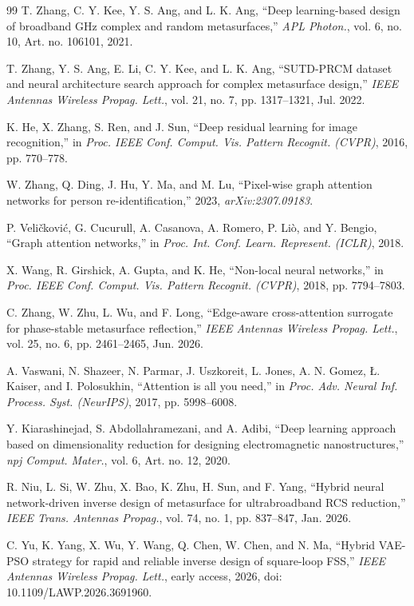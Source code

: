 \documentclass[journal]{IEEEtran}
\begin{document}
\begin{thebibliography}{99}
 T. Zhang, C. Y. Kee, Y. S. Ang, and L. K. Ang, ``Deep learning-based design of broadband GHz complex and random metasurfaces,'' \textit{APL Photon.}, vol. 6, no. 10, Art. no. 106101, 2021.

 T. Zhang, Y. S. Ang, E. Li, C. Y. Kee, and L. K. Ang, ``SUTD-PRCM dataset and neural architecture search approach for complex metasurface design,'' \textit{IEEE Antennas Wireless Propag. Lett.}, vol. 21, no. 7, pp. 1317--1321, Jul. 2022.

 K. He, X. Zhang, S. Ren, and J. Sun, ``Deep residual learning for image recognition,'' in \textit{Proc. IEEE Conf. Comput. Vis. Pattern Recognit. (CVPR)}, 2016, pp. 770--778.

 W. Zhang, Q. Ding, J. Hu, Y. Ma, and M. Lu, ``Pixel-wise graph attention networks for person re-identification,'' 2023, \textit{arXiv:2307.09183}.

 P. Veli\v{c}kovi\'{c}, G. Cucurull, A. Casanova, A. Romero, P. Li\`{o}, and Y. Bengio, ``Graph attention networks,'' in \textit{Proc. Int. Conf. Learn. Represent. (ICLR)}, 2018.

 X. Wang, R. Girshick, A. Gupta, and K. He, ``Non-local neural networks,'' in \textit{Proc. IEEE Conf. Comput. Vis. Pattern Recognit. (CVPR)}, 2018, pp. 7794--7803.

 C. Zhang, W. Zhu, L. Wu, and F. Long, ``Edge-aware cross-attention surrogate for phase-stable metasurface reflection,'' \textit{IEEE Antennas Wireless Propag. Lett.}, vol. 25, no. 6, pp. 2461--2465, Jun. 2026.

 A. Vaswani, N. Shazeer, N. Parmar, J. Uszkoreit, L. Jones, A. N. Gomez, {\L}. Kaiser, and I. Polosukhin, ``Attention is all you need,'' in \textit{Proc. Adv. Neural Inf. Process. Syst. (NeurIPS)}, 2017, pp. 5998--6008.

 Y. Kiarashinejad, S. Abdollahramezani, and A. Adibi, ``Deep learning approach based on dimensionality reduction for designing electromagnetic nanostructures,'' \textit{npj Comput. Mater.}, vol. 6, Art. no. 12, 2020.

 R. Niu, L. Si, W. Zhu, X. Bao, K. Zhu, H. Sun, and F. Yang, ``Hybrid neural network-driven inverse design of metasurface for ultrabroadband RCS reduction,'' \textit{IEEE Trans. Antennas Propag.}, vol. 74, no. 1, pp. 837--847, Jan. 2026.

 C. Yu, K. Yang, X. Wu, Y. Wang, Q. Chen, W. Chen, and N. Ma, ``Hybrid VAE-PSO strategy for rapid and reliable inverse design of square-loop FSS,'' \textit{IEEE Antennas Wireless Propag. Lett.}, early access, 2026, doi: 10.1109/LAWP.2026.3691960.


\end{thebibliography}
\end{document}
